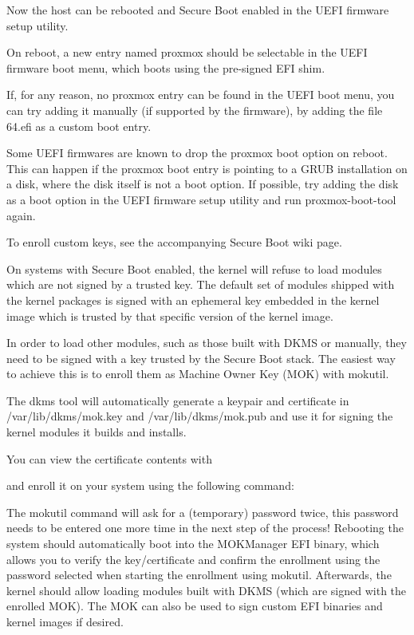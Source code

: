 Now the host can be rebooted and Secure Boot enabled in the UEFI firmware setup utility.

On reboot, a new entry named proxmox should be selectable in the UEFI firmware boot menu, which boots using the pre-signed EFI shim.

If, for any reason, no proxmox entry can be found in the UEFI boot menu, you can try adding it manually (if supported by the firmware), by adding the file \EFI\proxmox\shimx64.efi as a custom boot entry.

Some UEFI firmwares are known to drop the proxmox boot option on reboot. This can happen if the proxmox boot entry is pointing to a GRUB installation on a disk, where the disk itself is not a boot option. If possible, try adding the disk as a boot option in the UEFI firmware setup utility and run proxmox-boot-tool again.

To enroll custom keys, see the accompanying Secure Boot wiki page.

On systems with Secure Boot enabled, the kernel will refuse to load modules which are not signed by a trusted key. The default set of modules shipped with the kernel packages is signed with an ephemeral key embedded in the kernel image which is trusted by that specific version of the kernel image.

In order to load other modules, such as those built with DKMS or manually, they need to be signed with a key trusted by the Secure Boot stack. The easiest way to achieve this is to enroll them as Machine Owner Key (MOK) with mokutil.

The dkms tool will automatically generate a keypair and certificate in /var/lib/dkms/mok.key and /var/lib/dkms/mok.pub and use it for signing the kernel modules it builds and installs.

You can view the certificate contents with

and enroll it on your system using the following command:

The mokutil command will ask for a (temporary) password twice, this password needs to be entered one more time in the next step of the process! Rebooting the system should automatically boot into the MOKManager EFI binary, which allows you to verify the key/certificate and confirm the enrollment using the password selected when starting the enrollment using mokutil. Afterwards, the kernel should allow loading modules built with DKMS (which are signed with the enrolled MOK). The MOK can also be used to sign custom EFI binaries and kernel images if desired.

